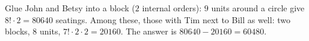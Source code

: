 Glue John and Betsy into a block ($2$ internal orders): $9$ units around a circle give $8!\cdot2=80640$ seatings. Among these, those with Tim next to Bill as well: two blocks, $8$ units, $7!\cdot2\cdot2=20160$. The answer is $80640-20160=\boxed{60480}$.
